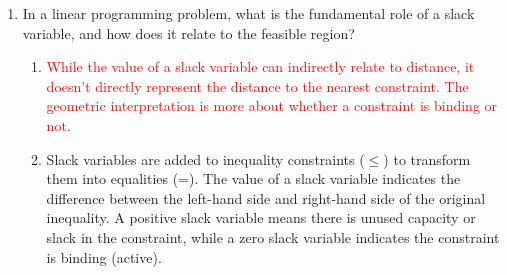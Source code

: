 \documentclass{article}%
\newcommand{\incorrect}[1]{\textcolor{red}{#1}}
\begin{document}
\begin{enumerate}
\begin{enumerate}
\begin{enumerate}
\item \incorrect{This is incorrect; it's not the value of Z at the IBFS.}%
\end{enumerate}%
\vspace{0.5em}%
\item Which variable would enter the basis in the first iteration of the simplex method?%
\begin{enumerate}%
\item \incorrect{Slack variables leave the basis, not enter.}%
\item \incorrect{Slack variables leave the basis, not enter.}%
\item \incorrect{While $x_1$ has a positive coefficient, $x_2$'s is larger.}%
\item The simplex method enters the variable with the largest positive coefficient in the objective function, which is $x_2$ (coefficient 3).%
\item \incorrect{The solution is not optimal at the IBFS.}%
\end{enumerate}%
\vspace{0.5em}%
\item What is the maximum value of $x_2$ allowed by the constraints, given that $x_1 = 0$?%
\begin{enumerate}%
\item \incorrect{This violates the first constraint.}%
\item If $x_1 = 0$, the constraints become $x_2 \le 5$ and $x_2 \le 7$. The most restrictive constraint is $x_2 \le 5$.%
\item \incorrect{This is not the maximum value allowed.}%
\item \incorrect{This is not the maximum value allowed.}%
\item \incorrect{This is not the maximum value allowed.}%
\end{enumerate}%
\vspace{0.5em}%
\end{enumerate}%
\item In a linear programming problem, what is the fundamental role of a slack variable, and how does it relate to the feasible region?%
\begin{enumerate}%
\item \incorrect{While the value of a slack variable can indirectly relate to distance, it doesn't directly represent the distance to the nearest constraint.  The geometric interpretation is more about whether a constraint is binding or not.}%
\item Slack variables are added to inequality constraints ($≤$) to transform them into equalities (=).  The value of a slack variable indicates the difference between the left-hand side and right-hand side of the original inequality. A positive slack variable means there is unused capacity or slack in the constraint, while a zero slack variable indicates the constraint is binding (active).%

\end{enumerate}
\end{enumerate}
\end{document}

